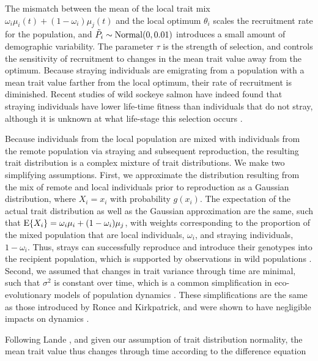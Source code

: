 \documentclass{revtex4}
\begin{document}
\noindent The mismatch between the mean of the local trait mix $\omega_i\mu_i(t) + (1-\omega_i)\mu_j(t)$ and the local optimum $\theta_i$ scales the recruitment rate for the population, and $\tilde{P}_i\sim {\rm Normal}(0,0.01)$ introduces a small amount of demographic variability.
The parameter $\tau$ is the strength of selection, and controls the sensitivity of recruitment to changes in the mean trait value away from the optimum.
Because straying individuals are emigrating from a population with a mean trait value farther from the local optimum, their rate of recruitment is diminished.
Recent studies of wild sockeye salmon have indeed found that straying individuals have lower life-time fitness than individuals that do not stray, although it is unknown at what life-stage this selection occurs \citep{Peterson:2014gy}.


Because individuals from the local population are mixed with individuals from the remote population via straying and subsequent reproduction, the resulting trait distribution is a complex mixture of trait distributions.
We make two simplifying assumptions.
First, we approximate the distribution resulting from the mix of remote and local individuals prior to reproduction as a Gaussian distribution, where $X_i=x_i$ with probability $g(x_i)$.
The expectation of the actual trait distribution as well as the Gaussian approximation are the same, such that ${\rm E}\{X_i\} = \omega_i\mu_i + (1-\omega_i)\mu_j$, with weights corresponding to the proportion of the mixed population that are local individuals, $\omega_i$, and straying individuals, $1-\omega_i$.
Thus, strays can successfully reproduce and introduce their genotypes into the recipient population, which is supported by observations in wild populations \citep{Jasper:2013cc}.
Second, we assumed that changes in trait variance through time are minimal, such that $\sigma^2$ is constant over time, which is a common simplification in eco-evolutionary models of population dynamics \citep{Lande:1976ga,Ronce:2001dp,Schreiber:2011wx,Gilbert:2014ee,Gibert:2015kc}.
These simplifications are the same as those introduced by Ronce and Kirkpatrick, and were shown to have negligible impacts on dynamics \citep{Ronce:2001dp}.



Following Lande \citep{Lande:1976ga}, and given our assumption of trait distribution normality, the mean trait value thus changes through time according to the difference equation
\end{document}
